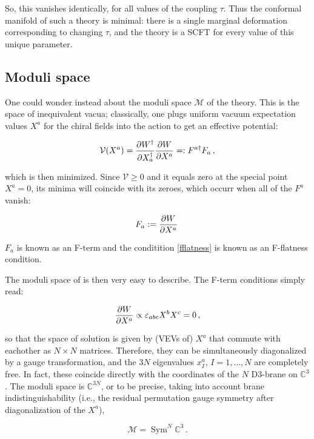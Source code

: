 So, this vanishes identically, for all values of the coupling $\tau$. Thus the conformal manifold of such a theory is minimal: there is a single marginal deformation corresponding to changing $\tau$, and the theory is a SCFT for every value of this unique parameter.

\subsection{Moduli space}

One could wonder instead about the moduli space $\mathcal{M}$ of the theory. This is the space of inequivalent vacua; classically, one plugs uniform vacuum expectation values $X^a$ for the chiral fields into the action to get an effective potential:

\begin{equation}
	\mathcal{V}(X^a) = \frac{\partial W^\dagger}{\partial X^\dagger_a} \frac{\partial W}{\partial X^a} =: F^{a\dagger} F_a\,,
	\label{}
\end{equation}

which is then minimized. Since $\mathcal{V} \geq 0$ and it equals zero at the special point $X^a = 0$, its minima will coincide with its zeroes, which occurr when all of the $F^a$ vanish:

\begin{equation}
	F_a := \frac{\partial W}{\partial X^a}\,
	\label{fflatness}
\end{equation}

$F_a$ is known as an F-term and the conditition \eqref{fflatness} is known as an F-flatness condition.

The moduli space of \SYM is then very easy to describe. The F-term conditions simply read:

\begin{equation}
	\frac{\partial W}{\partial X^a} \propto \varepsilon_{abc} X^b X^c = 0\,,
	\label{}
\end{equation}

so that the space of solution is given by (VEVs of) $X^a$ that commute with eachother as $N\times N$ matrices. Therefore, they can be simultaneously diagonalized by a gauge transformation, and the $3N$ eigenvalues $x^a_I$, $I=1,\ldots,N$ are completely free. In fact, these coincide directly with the coordinates of the $N$ D3-brane on $\mathbb{C}^3$. The moduli space is $\mathbb{C}^{3N}$, or to be precise, taking into account brane indistinguishability (i.e., the residual permutation gauge symmetry after diagonalization of the $X^a$),

\begin{equation}
	\mathcal{M} = \operatorname{Sym}^N \mathbb{C}^3\,.
	\label{}
\end{equation}

